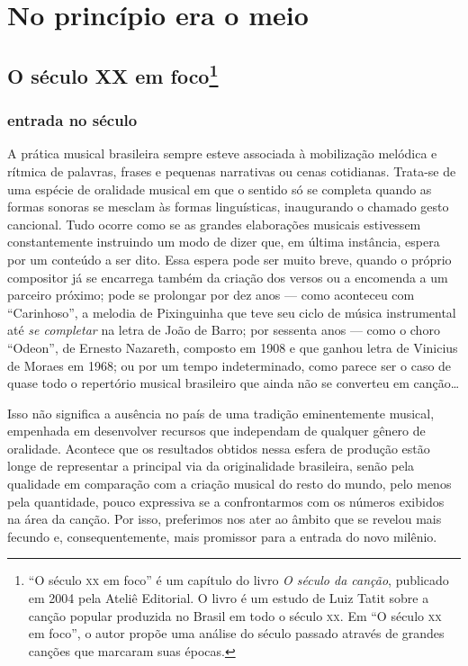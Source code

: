 \part{No princípio era o meio}

\chapter{O século XX em foco\footnote{``O século \textsc{xx} em foco'' é um capítulo do livro \textit{O século da canção}, publicado em 2004 pela Ateliê Editorial. O livro é um estudo de Luiz Tatit sobre a canção popular produzida no Brasil em todo o século \textsc{xx}. Em ``O século \textsc{xx} em foco'', o autor propõe uma análise do século passado através de grandes canções que marcaram suas épocas.}}

\section{entrada no século}

A prática musical brasileira sempre esteve associada à mobilização
melódica e rítmica de palavras, frases e pequenas narrativas ou cenas
cotidianas. Trata-se de uma espécie de oralidade musical em que o
sentido só se completa quando as formas sonoras se mesclam às formas
linguísticas, inaugurando o chamado gesto cancional. Tudo ocorre como se
as grandes elaborações musicais estivessem constantemente instruindo um
modo de dizer que, em última instância, espera por um conteúdo a ser
dito. Essa espera pode ser muito breve, quando o próprio compositor já
se encarrega também da criação dos versos ou a encomenda a um parceiro
próximo; pode se prolongar por dez anos --- como aconteceu com
``Carinhoso'', a melodia de Pixinguinha que teve seu ciclo de música
instrumental até \textit{se completar} na letra de João de Barro; por
sessenta anos --- como o choro ``Odeon'', de Ernesto Nazareth, composto
em 1908 e que ganhou letra de Vinicius de Moraes em 1968; ou por um
tempo indeterminado, como parece ser o caso de quase todo o repertório
musical brasileiro que ainda não se converteu em canção\ldots

Isso não significa a ausência no país de uma tradição eminentemente
musical, empenhada em desenvolver recursos que independam de qualquer
gênero de oralidade. Acontece que os resultados obtidos nessa esfera de
produção estão longe de representar a principal via da originalidade
brasileira, senão pela qualidade em comparação com a criação musical do
resto do mundo, pelo menos pela quantidade, pouco expressiva se a
confrontarmos com os números exibidos na área da canção. Por isso,
preferimos nos ater ao âmbito que se revelou mais fecundo e,
consequentemente, mais promissor para a entrada do novo milênio.

